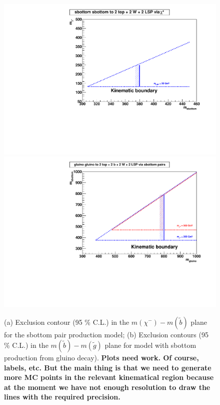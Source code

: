 \begin{figure}[thb]
\begin{center}
\includegraphics[width=0.49\linewidth]{figs/sbottom_fkw.pdf}
\includegraphics[width=0.49\linewidth]{figs/gluinoSbottom_fkw.pdf}
\caption{(a) 
Exclusion contour (95 \% C.L.) in the 
$m(\chi^{-})-m(\widetilde{b})$ 
plane for the sbottom pair production model; 
(b) Exclusion contours (95 \% C.L.) in the $m(\widetilde{b})-m(\widetilde{g})$
plane for model with sbottom production from gluino decay).
{\bf Plots need work.  Of course, labels, etc. But the main thing 
is that we need to generate more MC points in the relevant kinematical
region because at the moment we have not enough resolution to 
draw the lines with the required precision.}
\label{fig:sbottompaper}}
\end{center}
\end{figure}




\clearpage
